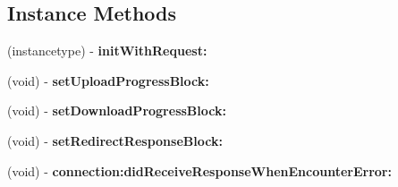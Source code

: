 \subsection*{Instance Methods}
\begin{DoxyCompactItemize}
\item 
\mbox{\label{interface_t_b_s_d_k_u_r_l_connection_operation_a1b86b20f2a9f8029bc5394f6070e2203}} 
(instancetype) -\/ {\bfseries init\+With\+Request\+:}
\item 
\mbox{\label{interface_t_b_s_d_k_u_r_l_connection_operation_a67c1435d297d5717c5be3f186ea8dbfc}} 
(void) -\/ {\bfseries set\+Upload\+Progress\+Block\+:}
\item 
\mbox{\label{interface_t_b_s_d_k_u_r_l_connection_operation_a8528f6ba941fcb7ddfbc6c1cbee81415}} 
(void) -\/ {\bfseries set\+Download\+Progress\+Block\+:}
\item 
\mbox{\label{interface_t_b_s_d_k_u_r_l_connection_operation_a623fe9313ff341f1f41897963ebc17c1}} 
(void) -\/ {\bfseries set\+Redirect\+Response\+Block\+:}
\item 
\mbox{\label{interface_t_b_s_d_k_u_r_l_connection_operation_adf0ddfc1a1f13f647df8f943d94eb0a3}} 
(void) -\/ {\bfseries connection\+:did\+Receive\+Response\+When\+Encounter\+Error\+:}
\end{DoxyCompactItemize}
